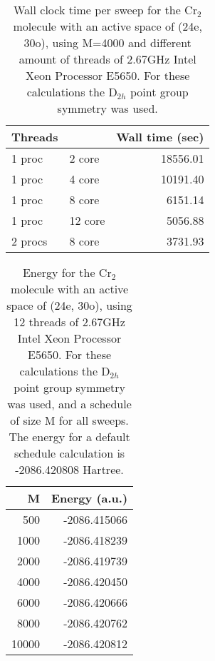 \documentclass[letterpaper,12pt,notitlepage]{article}
\begin{document}
\begin{table}
	\begin{center}
	\begin{tabular}{llr}
\hline
\hline
Threads && Wall time (sec)\\
\hline
1 proc &2 core  &18556.01\\
1 proc &4 core  &10191.40\\
1 proc &8 core  &6151.14\\
1 proc &12 core &5056.88\\
2 procs &8 core &3731.93\\
  \hline
  \hline
	\end{tabular}
		\end{center}
	\caption{Wall clock time per sweep for the Cr$_2$ molecule with an
	active space of (24e, 30o), using M=4000 and different amount of
	threads of 2.67GHz Intel Xeon Processor E5650. For these calculations
	the D$_{2h}$ point group symmetry was used.
	} \label{tab:thread}
\end{table}
\begin{table}
\begin{center}
 \begin{tabular}{rr}
  \hline
  \hline
M& Energy (a.u.)\\
\hline
500     &-2086.415066\\
1000	&-2086.418239\\
2000	&-2086.419739\\
4000	&-2086.420450\\
6000	&-2086.420666\\
8000	&-2086.420762\\
10000	&-2086.420812\\
\hline
  \hline
 \end{tabular}
\end{center}
\caption{Energy for  the Cr$_2$ molecule with an active space
of (24e, 30o), using 12 threads of 2.67GHz Intel Xeon Processor E5650. For
these calculations the D$_{2h}$ point group symmetry was used, and a schedule
of size M for all sweeps. The energy for a default schedule calculation
is -2086.420808 Hartree.} \label{tab:Energy}
\end{table}
\end{document}
